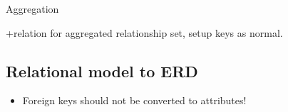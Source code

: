 \begin{theorem}
    {Aggregation}

    +relation for aggregated relationship set, setup keys as normal.
\end{theorem}

\subsection{Relational model to ERD}

\begin{itemize}
    \item Foreign keys should not be converted to attributes!
\end{itemize}






